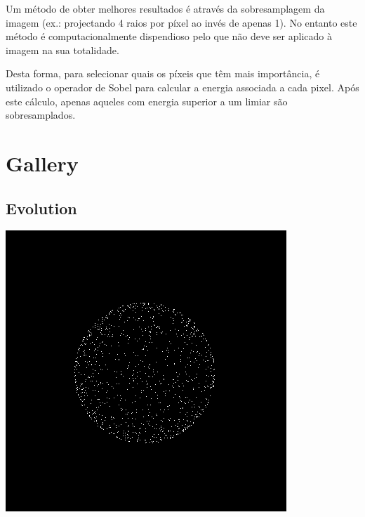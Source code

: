 \documentclass[a4paper]{article}
\begin{document}
\indent Um método de obter melhores resultados é através da sobresamplagem da imagem (ex.: projectando
4 raios por píxel ao invés de apenas 1). No entanto este método é computacionalmente dispendioso pelo que não
deve ser aplicado à imagem na sua totalidade.

\indent Desta forma, para selecionar quais os píxeis que têm mais importância, é utilizado o operador de Sobel
para calcular a energia associada a cada pixel. Após este cálculo, apenas aqueles com energia superior a um limiar
são sobresamplados.

\cleardoublepage
\section{Gallery}
\subsection{Evolution}
\begin{center}
	\includegraphics[scale=1.00]{images/gallery/photon_projection.png}
	\label{fig:photon_projection}
\end{center}
\end{document}
